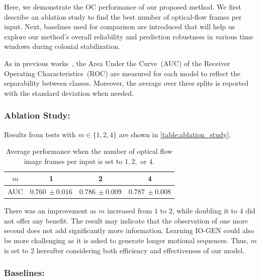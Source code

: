 \documentclass[letterpaper]{article} %
\let\orgautoref\autoref
\renewcommand{\autoref}
{\def\equationautorefname{Equation}%
\def\figureautorefname{Fig.}%
\def\subfigureautorefname{Fig.}%
\def\Itemautorefname{item}%
\def\tableautorefname{Table}%
\def\exerciseautorefname{Exercise}%
\def\starexerciseautorefname{Exercise}%
\def\sectionautorefname{Section}%
\def\subsectionautorefname{Section}%
\def\subsubsectionautorefname{Section}%
\def\chapterautorefname{Section}%
\def\partautorefname{Part}%
\orgautoref}
\begin{document}
Here, we demonstrate the OC performance of our proposed method. We first
describe an ablation study to find the best number of optical-flow
frames per input. Next, baselines used for comparison are introduced
that will help us explore our method's overall reliability and
prediction robustness in various time windows during colonial
stabilization.

As in previous works~\citep{RVGDSBMK18}, the Area Under the Curve~(AUC)
of the Receiver Operating Characteristics~(ROC) are measured for
each model to reflect the separability between classes. Moreover,
the average over three splits is reported with the standard
deviation when needed.

\subsubsection{Ablation Study:}
\label{sec:ablation_study}
Results from tests with $m \in \{1, 2, 4\}$ are shown in
\autoref{table:ablation_study}.
\setlength{\tabcolsep}{0.5em} %
{\renewcommand{\arraystretch}{1.2}%
\begin{table}
\centering
\begin{tabular}{|c|c|c|c|}
\hline
$m$  &  1 & 2 & 4  \\ \hline\hline
AUC & $0.760~\pm 0.016$ & $0.786~\pm 0.009$ & $0.787~\pm 0.008$
\\ \hline
\end{tabular}
\caption{Average performance when the number of optical flow
image frames per input is set to $1, 2,$ or $4$.}
\label{table:ablation_study}
\end{table}
}%
There was an improvement as $m$ increased from $1$ to $2$,
while doubling it to $4$ did not offer any benefit. The result may
indicate that the observation of one more second does not add
significantly more information. Learning \mbox{IO-GEN} could also be more
challenging as it is asked to generate longer motional sequences.  Thus,
$m$ is set to $2$ hereafter considering both efficiency and
effectiveness of our model.


\subsubsection{Baselines:}
\label{sec:baselines}
\end{document}
